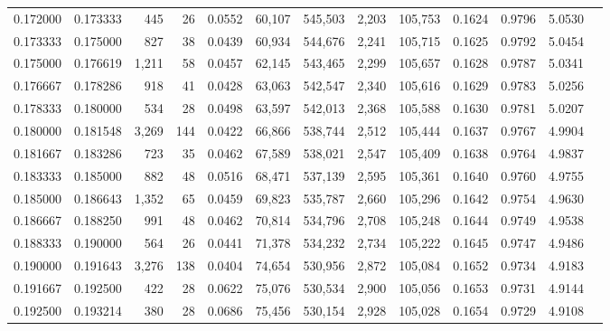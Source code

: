 \begin{tabular}{rrrrrrrrrrrrr}
0.172000 & 0.173333 &   445 &  26 &                                     0.0552 &  60,107 & 545,503 &   2,203 & 105,753 & 0.1624 & 0.9796 & 5.0530 \\
0.173333 & 0.175000 &   827 &  38 &                                     0.0439 &  60,934 & 544,676 &   2,241 & 105,715 & 0.1625 & 0.9792 & 5.0454 \\
0.175000 & 0.176619 & 1,211 &  58 &                                     0.0457 &  62,145 & 543,465 &   2,299 & 105,657 & 0.1628 & 0.9787 & 5.0341 \\
0.176667 & 0.178286 &   918 &  41 &                                     0.0428 &  63,063 & 542,547 &   2,340 & 105,616 & 0.1629 & 0.9783 & 5.0256 \\
0.178333 & 0.180000 &   534 &  28 &                                     0.0498 &  63,597 & 542,013 &   2,368 & 105,588 & 0.1630 & 0.9781 & 5.0207 \\
0.180000 & 0.181548 & 3,269 & 144 &                                     0.0422 &  66,866 & 538,744 &   2,512 & 105,444 & 0.1637 & 0.9767 & 4.9904 \\
0.181667 & 0.183286 &   723 &  35 &                                     0.0462 &  67,589 & 538,021 &   2,547 & 105,409 & 0.1638 & 0.9764 & 4.9837 \\
0.183333 & 0.185000 &   882 &  48 &                                     0.0516 &  68,471 & 537,139 &   2,595 & 105,361 & 0.1640 & 0.9760 & 4.9755 \\
0.185000 & 0.186643 & 1,352 &  65 &                                     0.0459 &  69,823 & 535,787 &   2,660 & 105,296 & 0.1642 & 0.9754 & 4.9630 \\
0.186667 & 0.188250 &   991 &  48 &                                     0.0462 &  70,814 & 534,796 &   2,708 & 105,248 & 0.1644 & 0.9749 & 4.9538 \\
0.188333 & 0.190000 &   564 &  26 &                                     0.0441 &  71,378 & 534,232 &   2,734 & 105,222 & 0.1645 & 0.9747 & 4.9486 \\
0.190000 & 0.191643 & 3,276 & 138 &                                     0.0404 &  74,654 & 530,956 &   2,872 & 105,084 & 0.1652 & 0.9734 & 4.9183 \\
0.191667 & 0.192500 &   422 &  28 &                                     0.0622 &  75,076 & 530,534 &   2,900 & 105,056 & 0.1653 & 0.9731 & 4.9144 \\
0.192500 & 0.193214 &   380 &  28 &                                     0.0686 &  75,456 & 530,154 &   2,928 & 105,028 & 0.1654 & 0.9729 & 4.9108 \\

\end{tabular}
